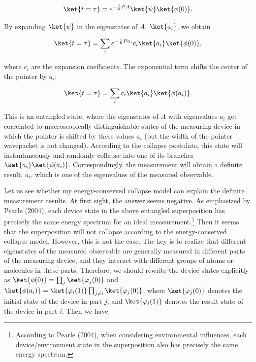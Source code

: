 \begin{equation}
\ket{t=\tau} = e^{-{i\over\hbar} P A } \ket{\psi}  \ket{\phi(0)}.
\end{equation}

\noindent By expanding $\ket{\psi}$  in the eigenstates of $A$, $\ket{a_i}$, we obtain
 
\begin{equation}
\ket{t=\tau} = \sum_{i} e^{-{i\over\hbar} P a_i } c_i \ket{a_i} \ket{\phi(0)},
\end{equation}

\noindent where $c_i$ are the expansion coefficients. The exponential term shifts the center of the pointer by $a_i$:

\begin{equation}
\ket{t=\tau} = \sum_{i} c_i \ket{a_i} \ket{\phi(a_i)}.
\end{equation}

\noindent  This is an entangled state, where the eigenstates of $A$ with eigenvalues $a_i$ get correlated to macroscopically distinguishable states of the measuring device in which the pointer is shifted by these values $a_i$ (but the width of the pointer wavepacket is not changed). According to the collapse postulate, this state will instantaneously and randomly collapse into one of its branches $\ket{a_i} \ket{\phi(a_i)}$. Correspondingly, the measurement will obtain a definite result, $a_i$, which is one of the eigenvalues of the measured observable.

Let us see whether my energy-conserved collapse model can explain the definite measurement results. At first sight, the answer seems negative. As emphasized by Pearle (2004), each device state in the above entangled superposition has precisely the same energy spectrum for an ideal measurement.\footnote{According to Pearle (2004), when considering environmental influences, each device/environment state in the superposition also has precisely the same energy spectrum.} Then it seems that the superposition will not collapse according to the energy-conserved collapse model. However, this is not the case. The key is to realize that different eigenstates of the measured observable are generally measured in different parts of the measuring device, and they interact with different groups of atoms or molecules in these parts. Therefore, we should rewrite the device states explicitly as $\ket{\phi(0)} = \prod_j \ket{\varphi_j(0)}$ and $\ket{\phi(a_i)}=\ket{\varphi_i(1)}\prod_{j\neq i}\ket{\varphi_j(0)}$, where $ \ket{\varphi_j(0)}$ denotes the initial state of the device in part $j$, and $\ket{\varphi_i(1)}$ denotes the result state of the device in part $i$. Then we have

